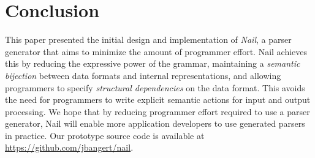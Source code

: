 \section{Conclusion}
\label{s:concl}

This paper presented the initial design and implementation of
\textit{Nail}, a parser generator that aims to minimize the amount
of programmer effort.  Nail achieves this by reducing the expressive
power of the grammar, maintaining a \emph{semantic bijection} between
data formats and internal representations, and allowing programmers to
specify \emph{structural dependencies} on the data format.  This avoids
the need for programmers to write explicit semantic actions for input
and output processing.  We hope that by reducing programmer effort
required to use a parser generator, Nail will enable more application
developers to use generated parsers in practice.  Our prototype source
code is available at \url{https://github.com/jbangert/nail}.

